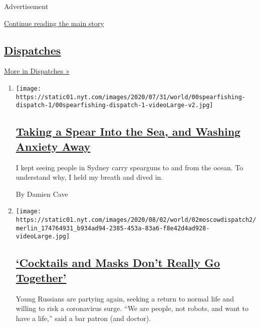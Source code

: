 Advertisement

\protect\hyperlink{after-mid2}{Continue reading the main story}

\hypertarget{dispatches}{%
\subsection{\texorpdfstring{\href{/spotlight/dispatches-international}{Dispatches}}{Dispatches}}\label{dispatches}}

\href{/spotlight/dispatches-international}{More in Dispatches »}

\begin{enumerate}
\def\labelenumi{\arabic{enumi}.}
\item
  \texttt{[image: https://static01.nyt.com/images/2020/07/31/world/00spearfishing-dispatch-1/00spearfishing-dispatch-1-videoLarge-v2.jpg]}

  \hypertarget{taking-a-spear-into-the-sea-and-washing-anxiety-away}{%
  \subsection{\texorpdfstring{\href{/2020/08/03/world/australia/spearfishing-sydney-coronavirus.html}{Taking
  a Spear Into the Sea, and Washing Anxiety
  Away}}{Taking a Spear Into the Sea, and Washing Anxiety Away}}\label{taking-a-spear-into-the-sea-and-washing-anxiety-away}}

  I kept seeing people in Sydney carry spearguns to and from the ocean.
  To understand why, I held my breath and dived in.

  By Damien Cave
\item
  \texttt{[image: https://static01.nyt.com/images/2020/08/02/world/02moscowdispatch2/merlin\_174764931\_b934ad94-2385-453a-83a6-f8e42d4ad928-videoLarge.jpg]}

  \hypertarget{cocktails-and-masks-dont-really-go-together}{%
  \subsection{\texorpdfstring{\href{/2020/08/01/world/europe/russia-moscow-coronavirus.html}{`Cocktails
  and Masks Don't Really Go
  Together'}}{`Cocktails and Masks Don't Really Go Together'}}\label{cocktails-and-masks-dont-really-go-together}}

  Young Russians are partying again, seeking a return to normal life and
  willing to risk a coronavirus surge. ``We are people, not robots, and
  want to have a life,'' said a bar patron (and doctor).


\end{enumerate}
